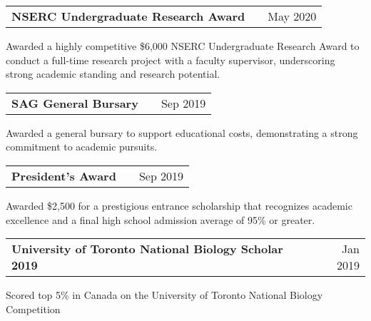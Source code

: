\documentclass[a4paper,10pt]{article}
\begin{document}
\begin{tabularx}{\linewidth}{@{}l X r@{}}
\textbf{NSERC Undergraduate Research Award} & \hfill &     May 2020
 \\[3.75pt]
\end{tabularx}
Awarded a highly competitive \$6,000 NSERC Undergraduate Research Award to conduct a full-time research project with a faculty supervisor, underscoring strong academic standing and research potential.
\vspace{6pt}

\begin{tabularx}{\linewidth}{@{}l X r@{}}
\textbf{SAG General Bursary} & \hfill &     Sep 2019
 \\[3.75pt]
\end{tabularx}
Awarded a general bursary to support educational costs, demonstrating a strong commitment to academic pursuits.
\vspace{6pt}

\begin{tabularx}{\linewidth}{@{}l X r@{}}
\textbf{President’s Award} & \hfill &     Sep 2019
 \\[3.75pt]
\end{tabularx}
Awarded \$2,500 for a prestigious entrance scholarship that recognizes academic excellence and a final high school admission average of 95\% or greater.


\vspace{6pt}

\begin{tabularx}{\linewidth}{@{}l X r@{}}
\textbf{University of Toronto National Biology Scholar 2019 } & \hfill &     Jan 2019
 \\[3.75pt]
\end{tabularx}
Scored top 5\% in Canada on the University of Toronto National Biology Competition


\end{document}
